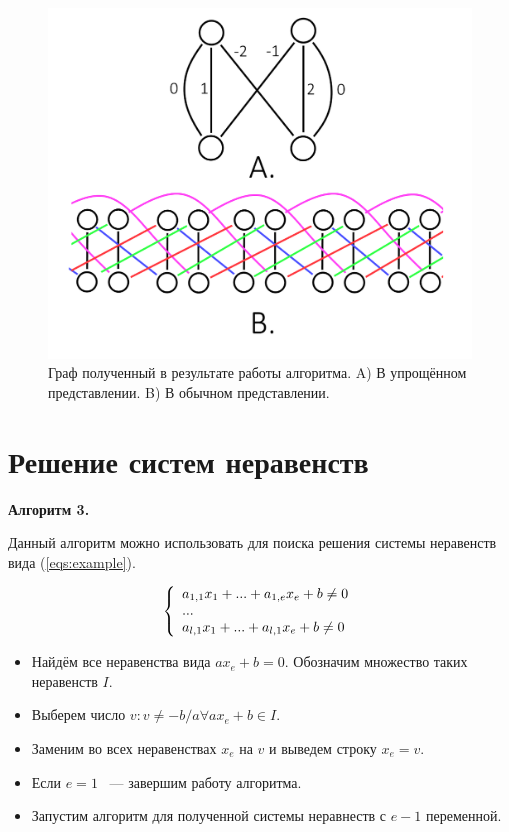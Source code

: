 \documentclass[14pt]{mmcs-article}
\begin{document}
\begin{figure}[H]
  \centering
  \includegraphics[scale=0.4]{Fig_7.png}
  \caption{ Граф полученный в результате работы алгоритма. A) В упрощённом представлении. B) В обычном представлении. }
  \label{image:7}
\end{figure}

\newpage

\section{Решение систем неравенств}

\textbf{Алгоритм 3.}

Данный алгоритм можно использовать для поиска решения системы неравенств вида (\ref{eqs:example}).

\begin{equation}
    \centering
    \left\{
        \begin{array}{ll}
            a_{1,1} x_1 + ... + a_{1,e} x_e + b \neq 0\\
            ...\\
            a_{l,1} x_1 + ... + a_{l,1} x_e + b \neq 0\\
        \end{array}
    \right.
    \label{eqs:example}
\end{equation}

\begin{itemize}
    \item Найдём все неравенства  вида $a x_e + b = 0$. Обозначим множество таких неравенств $I$.
    \item Выберем число $v: v \neq -b/a \forall a x_e + b \in I$.
    \item Заменим во всех неравенствах $x_e$ на $v$ и выведем строку $x_e = v$.
    \item Если $e = 1$ ~--- завершим работу алгоритма.
    \item Запустим алгоритм для полученной системы неравнеств с $e - 1$ переменной.
\end{itemize}
\end{document}
